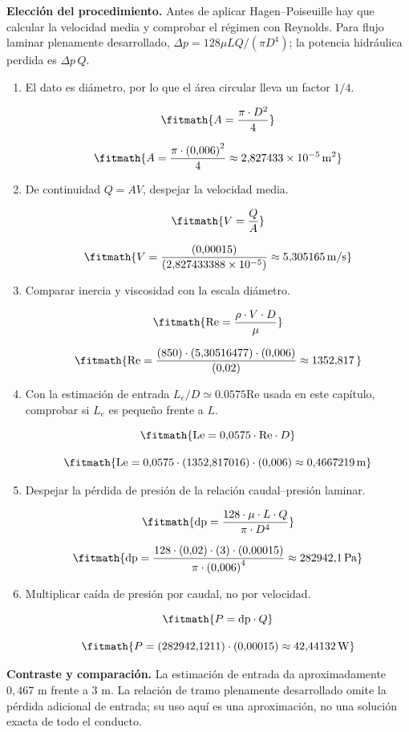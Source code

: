\noindent\textbf{Elección del procedimiento.} Antes de aplicar Hagen--Poiseuille hay que calcular la velocidad media y comprobar el régimen con Reynolds. Para flujo laminar plenamente desarrollado, $\Delta p=128\mu LQ/(\pi D^4)$; la potencia hidráulica perdida es $\Delta p\,Q$.

\begin{enumerate}

\item El dato es diámetro, por lo que el área circular lleva un factor $1/4$.

\[\fitmath{A=\frac{\pi\cdot {D}^{2}}{4}}\]

\[\fitmath{A=\frac{\pi\cdot {(0{,}006)}^{2}}{4}\approx 2{,}827433\times10^{-5}\,\mathrm{m^{2}}}\]

\item De continuidad $Q=AV$, despejar la velocidad media.

\[\fitmath{V=\frac{Q}{A}}\]

\[\fitmath{V=\frac{(0{,}00015)}{(2{,}827433388\times10^{-5})}\approx 5{,}305165\,\mathrm{m/s}}\]

\item Comparar inercia y viscosidad con la escala diámetro.

\[\fitmath{\mathrm{Re}=\frac{\rho\cdot V\cdot D}{\mu}}\]

\[\fitmath{\mathrm{Re}=\frac{(850)\cdot (5{,}30516477)\cdot (0{,}006)}{(0{,}02)}\approx 1352{,}817\,}\]

\item Con la estimación de entrada $L_e/D\simeq0.0575\mathrm{Re}$ usada en este capítulo, comprobar si $L_e$ es pequeño frente a $L$.

\[\fitmath{\mathrm{Le}=0{,}0575\cdot \mathrm{Re}\cdot D}\]

\[\fitmath{\mathrm{Le}=0{,}0575\cdot (1352{,}817016)\cdot (0{,}006)\approx 0{,}4667219\,\mathrm{m}}\]

\item Despejar la pérdida de presión de la relación caudal--presión laminar.

\[\fitmath{\mathrm{dp}=\frac{128\cdot \mu\cdot L\cdot Q}{\pi\cdot {D}^{4}}}\]

\[\fitmath{\mathrm{dp}=\frac{128\cdot (0{,}02)\cdot (3)\cdot (0{,}00015)}{\pi\cdot {(0{,}006)}^{4}}\approx 282942{,}1\,\mathrm{Pa}}\]

\item Multiplicar caída de presión por caudal, no por velocidad.

\[\fitmath{P=\mathrm{dp}\cdot Q}\]

\[\fitmath{P=(282942{,}1211)\cdot (0{,}00015)\approx 42{,}44132\,\mathrm{W}}\]

\end{enumerate}

\noindent\textbf{Contraste y comparación.} La estimación de entrada da aproximadamente $0{,}467$ m frente a 3 m. La relación de tramo plenamente desarrollado omite la pérdida adicional de entrada; su uso aquí es una aproximación, no una solución exacta de todo el conducto.
